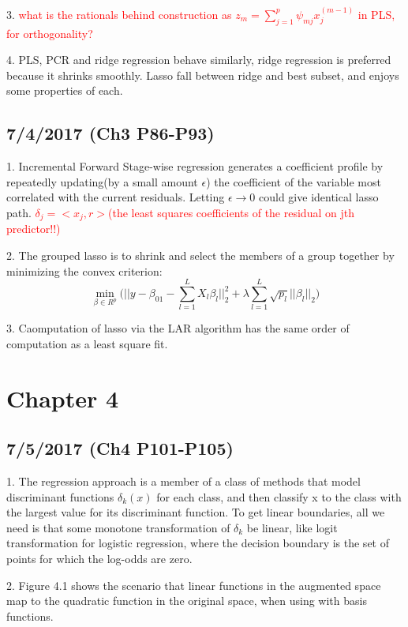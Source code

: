 \documentclass[a4paper, 12pt]{article}
\begin{document}
3. \textcolor{red}{ what is the rationals behind construction as $z_m=\sum_{j=1}^{p}\psi_{mj}x_j^{(m-1)} $ in PLS, for orthogonality?}

4. PLS, PCR and ridge regression behave similarly, ridge regression is preferred because it shrinks smoothly. Lasso fall between ridge and best subset, and enjoys some properties of each.

\subsection*{7/4/2017 (Ch3 P86-P93)}

1. Incremental Forward Stage-wise regression generates a coefficient profile by repeatedly updating(by a small amount $\epsilon$) the coefficient of the variable most correlated with the current residuals. Letting $\epsilon \rightarrow 0$ could give identical lasso path. \textcolor{red}{$\delta_j=<x_j,r>$(the least squares coefficients of the residual on jth predictor!!)}

2. The grouped lasso is to shrink and select the members of a group together by minimizing the convex criterion:$$\displaystyle{\min_{\beta \in R^p}}\Bigg(||y-\beta_01-\sum_{l=1}^{L}X_l\beta_l||_2^2 + \lambda\sum_{l=1}^{L}\sqrt{p_l}||\beta_l||_2\Bigg)$$

3. Caomputation of lasso via the LAR algorithm has the same order of computation as a least square fit.

\section*{Chapter 4}

\subsection*{7/5/2017 (Ch4 P101-P105)}

1. The regression approach is a member of a class of methods that model discriminant functions $\delta_k(x)$ for each class, and then classify x to the class with the largest value for its discriminant function. To get linear boundaries, all we need is that some monotone transformation of $\delta_k$ be linear, like logit transformation for logistic regression, where the decision boundary is the set of points for which the log-odds are zero.

2. Figure 4.1 shows the scenario that linear functions in the augmented space map to the quadratic function in the original space, when using with basis functions.
\end{document}
